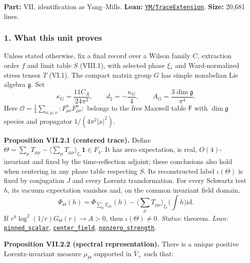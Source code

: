 \documentclass[
  letterpaper,
  11pt]{article}
\begin{document}
\textbf{Part:} VII, identification as Yang--Mills. \textbf{Lean:}
\href{https://github.com/yang-mills-group/OpenAI-YM-20261028/tree/3456e5e75cf8d4cd558955a5c7638fba2d68f464/YM/TraceExtension}{\texttt{YM/TraceExtension}}.
\textbf{Size:} 20,681 lines.

\subsubsection{1. What this unit proves}\label{what-this-unit-proves-26}

Unless stated otherwise, fix a final record over a Wilson family \(C\),
extraction order \(f\) and limit table \(S\) (VIII.1), with selected
phase \(\xi_*\) and Ward-normalized stress tensor \(T\) (VI.1). The
compact matrix group \(G\) has simple nonabelian Lie algebra
\(\mathfrak g\). Set
\[\kappa_G=\frac{11C_A}{24\pi^2},\qquad d_2=-\frac{\kappa_G}{4},\qquad A_G=\frac{3\dim\mathfrak g}{\pi^4}.\]
Here \(\mathcal O=\tfrac14\sum_{a,\mu,\nu}:F^a_{\mu\nu}F^a_{\mu\nu}:\)
belongs to the free Maxwell table \(\mathsf F\) with \(\dim\mathfrak g\)
species and propagator \(1/(4\pi^2|x|^2)\).

\textbf{Proposition VII.2.1 (centered trace).} Define
\(\Theta=\sum_\mu T_{\mu\mu}-\langle\sum_\mu T_{\mu\mu}\rangle_{\xi_*}\mathbf1\in F_4\).
It has zero expectation, is real, \(O(4)\)-invariant and fixed by the
time-reflection adjoint; these conclusions also hold when centering in
any phase table respecting \(S\). Its reconstructed label
\(\iota(\Theta)\) is fixed by conjugation \(J\) and every Lorentz
transformation. For every Schwartz test \(h\), its vacuum expectation
vanishes and, on the common invariant field domain,
\[\Phi_\Theta(h)=\Phi_{\sum_\mu T_{\mu\mu}}(h)-\Big\langle\sum_\mu T_{\mu\mu}\Big\rangle_{\xi_*}\Big(\int h\Big)\mathrm{id}.\]
If \(r^8\log^2(1/r)G_\Theta(r)\to A>0\), then \(\iota(\Theta)\ne0\).
\emph{Status:} theorem. \emph{Lean:}
\href{https://github.com/yang-mills-group/OpenAI-YM-20261028/blob/3456e5e75cf8d4cd558955a5c7638fba2d68f464/YM/TraceExtension/WilsonTrace.lean\#L61-L63}{\texttt{pinned\_scalar}},
\href{https://github.com/yang-mills-group/OpenAI-YM-20261028/blob/3456e5e75cf8d4cd558955a5c7638fba2d68f464/YM/TraceExtension/Link/Identity.lean\#L158-L161}{\texttt{center\_field}},
\href{https://github.com/yang-mills-group/OpenAI-YM-20261028/blob/3456e5e75cf8d4cd558955a5c7638fba2d68f464/YM/TraceExtension/Sundial/Grand.lean\#L23-L27}{\texttt{nonzero\_strength}}.

\textbf{Proposition VII.2.2 (spectral representation).} There is a
unique positive Lorentz-invariant measure \(\mu_\Theta\) supported in
\(\bar V_+\) such that:
\end{document}

